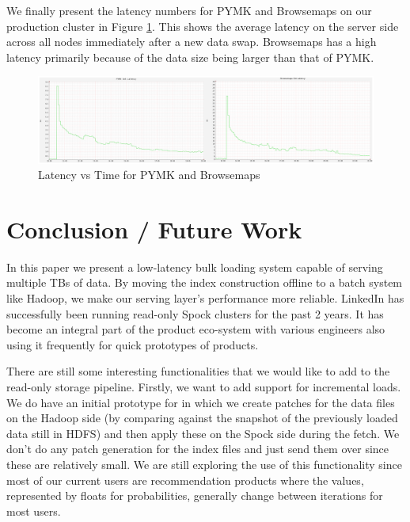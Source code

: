\documentclass[twocolumn]{article}
\newcommand{\projectname}{Spock}
\begin{document}
We finally present the latency numbers for PYMK and Browsemaps on our production cluster in Figure \ref{production}. This shows the average latency on the server side across all nodes immediately after a new data swap. Browsemaps has a high latency primarily because of the data size being larger than that of PYMK.

\begin{figure}
  \centering
    \includegraphics[scale=0.23]{images/get_latency.png}
  \caption{Latency vs Time for PYMK and Browsemaps}
  \label{production}
\end{figure}





\section{Conclusion / Future Work}
\label{sec:conclusion}

In this paper we present a low-latency bulk loading system capable of serving multiple TBs of data. By moving the index construction offline to a batch system like Hadoop, we make our serving layer's performance more reliable. LinkedIn has successfully been running read-only \projectname{} clusters for the past 2 years. It has become an integral part of the product eco-system with various engineers also using it frequently for quick prototypes of products. 

There are still some interesting functionalities that we would like to add to the read-only storage pipeline. Firstly, we want to add support for incremental loads. We do have an initial prototype for in which we create patches for the data files on the Hadoop side (by comparing against the snapshot of the previously loaded data still in HDFS) and then apply these on the \projectname{} side during the fetch. We don't do any patch generation for the index files and just send them over since these are relatively small. We are still exploring the use of this functionality since most of our current users are recommendation products where the values, represented by floats for probabilities, generally change between iterations for most users. 
\end{document}
